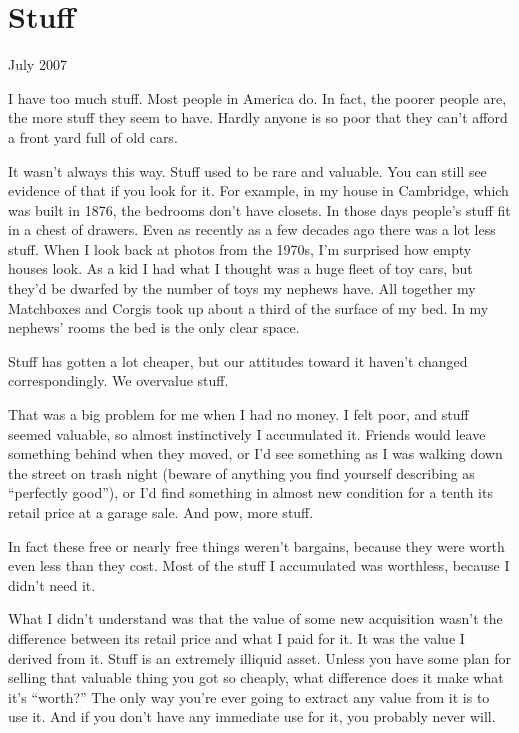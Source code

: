 \chapter{Stuff}

July 2007

I have too much stuff. Most people in America do. In fact, the poorer
people are, the more stuff they seem to have. Hardly anyone is so poor
that they can't afford a front yard full of old cars.

It wasn't always this way. Stuff used to be rare and valuable. You can
still see evidence of that if you look for it. For example, in my house
in Cambridge, which was built in 1876, the bedrooms don't have closets.
In those days people's stuff fit in a chest of drawers. Even as recently
as a few decades ago there was a lot less stuff. When I look back at
photos from the 1970s, I'm surprised how empty houses look. As a kid I
had what I thought was a huge fleet of toy cars, but they'd be dwarfed
by the number of toys my nephews have. All together my Matchboxes and
Corgis took up about a third of the surface of my bed. In my nephews'
rooms the bed is the only clear space.

Stuff has gotten a lot cheaper, but our attitudes toward it haven't
changed correspondingly. We overvalue stuff.

That was a big problem for me when I had no money. I felt poor, and
stuff seemed valuable, so almost instinctively I accumulated it. Friends
would leave something behind when they moved, or I'd see something as I
was walking down the street on trash night (beware of anything you find
yourself describing as ``perfectly good''), or I'd find something in
almost new condition for a tenth its retail price at a garage sale. And
pow, more stuff.

In fact these free or nearly free things weren't bargains, because they
were worth even less than they cost. Most of the stuff I accumulated was
worthless, because I didn't need it.

What I didn't understand was that the value of some new acquisition
wasn't the difference between its retail price and what I paid for it.
It was the value I derived from it. Stuff is an extremely illiquid
asset. Unless you have some plan for selling that valuable thing you got
so cheaply, what difference does it make what it's ``worth?'' The only
way you're ever going to extract any value from it is to use it. And if
you don't have any immediate use for it, you probably never will.

